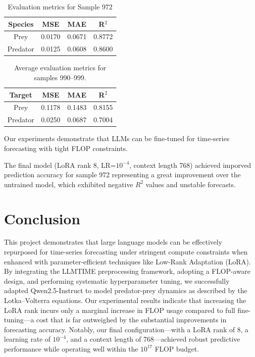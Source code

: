 \documentclass[a4paper,12pt]{article}
\begin{document}
\begin{table}[H]
    \centering

    \begin{tabular}{|c|c|c|c|}
        \hline
        \textbf{Species} & \textbf{MSE} & \textbf{MAE} & \textbf{R$^2$} \\
        \hline
        Prey & 0.0170 & 0.0671 & 0.8772 \\
        Predator & 0.0125 & 0.0608 & 0.8600 \\
        \hline
    \end{tabular}
    \vspace{0.2cm}
    \caption{Evaluation metrics for Sample 972}
    \label{tab:metrics_sample972}
\end{table}

\begin{table}[H]
  \centering
  \begin{tabular}{|c|c|c|c|}
      \hline
      \textbf{Target} & \textbf{MSE} & \textbf{MAE} & \textbf{R$^2$} \\
      \hline
      Prey & 0.1178 & 0.1483 & 0.8155 \\
      Predator & 0.0250 & 0.0687 & 0.7004 \\
      \hline
  \end{tabular}
  \vspace{0.2cm}
  \caption{Average evaluation metrics for samples 990–999.}
  \label{tab:avg_metrics_990_999}
  \end{table}

  Our experiments demonstrate that LLMs can be fine-tuned for time-series forecasting with tight FLOP constraints.
  
  The final model (LoRA rank 8, LR=$10^{-4}$, context length 768) achieved imporved prediction accuracy for sample 972 representing a great improvement over the untrained model, which exhibited negative $R^2$ values and unstable forecasts.
  
  \section{Conclusion}

  This project demonstrates that large language models can be effectively repurposed for time-series forecasting under stringent compute constraints when enhanced with parameter-efficient techniques like Low-Rank Adaptation (LoRA). By integrating the LLMTIME preprocessing framework, adopting a FLOP-aware design, and performing systematic hyperparameter tuning, we successfully adapted Qwen2.5-Instruct to model predator-prey dynamics as described by the Lotka–Volterra equations. Our experimental results indicate that increasing the LoRA rank incurs only a marginal increase in FLOP usage compared to full fine-tuning—a cost that is far outweighed by the substantial improvements in forecasting accuracy. Notably, our final configuration—with a LoRA rank of 8, a learning rate of $10^{-4}$, and a context length of 768—achieved robust predictive performance while operating well within the $10^{17}$ FLOP budget.
  
\end{document}
